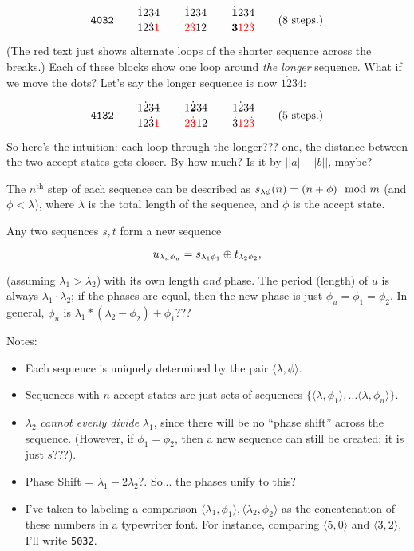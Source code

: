 \documentclass{article}
\begin{document}
\[
  \texttt{4032} \qquad
  \SeqCompare{\dot{1}234}{12\dot{3}\textcolor{red}{1}} \qquad
  \SeqCompare{\dot{1}234}{\textcolor{red}{2\dot{3}}12} \qquad
  \SeqCompare{\dot{\mathbf{1}}234}{\dot{\mathbf{3}}\textcolor{red}{12\dot{3}}} \qquad
  \text{(8 steps.)}
\]

(The red text just shows alternate loops of the shorter sequence across the
breaks.) Each of these blocks show one loop around \emph{the longer} sequence. What if we move the dots? Let's say the longer sequence is now $1\dot{2}34$:

\[
  \texttt{4132} \qquad
  \SeqCompare{1\dot{2}34}{12\dot{3}\textcolor{red}{1}} \qquad
  \SeqCompare{1\dot{\mathbf{2}}34}{\textcolor{red}{2\dot{\mathbf{3}}}12} \qquad
  \SeqCompare{1\dot{2}34}{\dot{3}\textcolor{red}{12\dot{3}}} \qquad
  \text{(5 steps.)}
\]


So here's the intuition: each loop through the longer??? one, the distance between the two accept states gets closer. By how much? Is it by $\big| |a| - |b| \big|$, maybe?



The $n^\text{th}$ step of each sequence can be described as $\Seq{s}(n) = (n +
\phi) \mod m$ (and $\phi < \lambda$), where $\lambda$ is the total length of the
sequence, and $\phi$ is the accept state.



Any two sequences $s, t$ form a new sequence

\[
  \Seqn{u}{u} = \Seqn{s}{1} \oplus \Seqn{t}{2},
\]

(assuming $\lambda_1 > \lambda_2$) with its own length \emph{and} phase. The
period (length) of $u$ is always $\lambda_1 \cdot \lambda_2$; if the phases are
equal, then the new phase is just $\phi_u = \phi_1 = \phi_2$. In general,
$\phi_u$ is $\lambda_1 * (\lambda_2 - \phi_2) + \phi_1$???

Notes:
\begin{itemize}
  \item Each sequence is uniquely determined by the pair $\langle \lambda, \phi \rangle$.
  \item Sequences with $n$ accept states are just sets of sequences $\{ \langle \lambda, \phi_1 \rangle, \dots \langle \lambda, \phi_n \rangle \}$.
  \item $\lambda_2$ \emph{cannot evenly divide} $\lambda_1$, since there will be no ``phase shift'' across the sequence. (However, if $\phi_1 = \phi_2$, then a new sequence can still be created; it is just $s$???).
  \item Phase Shift = $\lambda_1 - 2\lambda_2$?. So... the phases unify to this?
  \item I've taken to labeling a comparison $\langle \lambda_1, \phi_1 \rangle, \langle \lambda_2, \phi_2 \rangle$ as the concatenation of these numbers in a typewriter font. For instance, comparing $\langle 5, 0 \rangle$ and $\langle 3, 2 \rangle$, I'll write \texttt{5032}.
\end{itemize}
\end{document}

